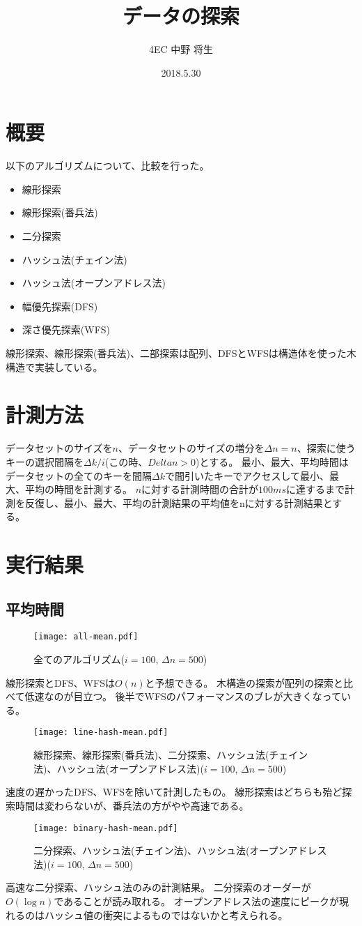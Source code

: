 \documentclass[dvipdfmx]{jsarticle}
\author{4EC 中野 将生}
\date{2018.5.30}
\title{データの探索}
\begin{document}
	\maketitle
	\section{概要}
		以下のアルゴリズムについて、比較を行った。
		\begin{itemize}
			\item 線形探索
			\item 線形探索(番兵法)
			\item 二分探索
			\item ハッシュ法(チェイン法)
			\item ハッシュ法(オープンアドレス法)
			\item 幅優先探索(DFS)
			\item 深さ優先探索(WFS)
		\end{itemize}
		線形探索、線形探索(番兵法)、二部探索は配列、DFSとWFSは構造体を使った木構造で実装している。
	\section{計測方法}
		データセットのサイズを$n$、データセットのサイズの増分を$\Delta n = n$、探索に使うキーの選択間隔を$\Delta k/i$(この時、$Delta n > 0$)とする。
		最小、最大、平均時間はデータセットの全てのキーを間隔$\Delta k$で間引いたキーでアクセスして最小、最大、平均の時間を計測する。
		$n$に対する計測時間の合計が$100 ms$に達するまで計測を反復し、最小、最大、平均の計測結果の平均値をnに対する計測結果とする。
	\section{実行結果}
		\subsection{平均時間}
			\begin{figure}[H]
				\caption{全てのアルゴリズム($i = 100$, $\Delta n = 500$)}
				\texttt{[image: all-mean.pdf]}
				\label{fig:all-mean}
			\end{figure}
			線形探索とDFS、WFSは$O(n)$と予想できる。
			木構造の探索が配列の探索と比べて低速なのが目立つ。
			後半でWFSのパフォーマンスのブレが大きくなっている。
			\begin{figure}[H]
				\caption{線形探索、線形探索(番兵法)、二分探索、ハッシュ法(チェイン法)、ハッシュ法(オープンアドレス法)($i = 100$, $\Delta n = 500$)}
				\texttt{[image: line-hash-mean.pdf]}
				\label{fig:line-hash-mean}
			\end{figure}
			速度の遅かったDFS、WFSを除いて計測したもの。
			線形探索はどちらも殆ど探索時間は変わらないが、番兵法の方がやや高速である。
			\begin{figure}[H]
				\caption{二分探索、ハッシュ法(チェイン法)、ハッシュ法(オープンアドレス法)($i = 100$, $\Delta n = 500$)}
				\texttt{[image: binary-hash-mean.pdf]}
				\label{fig:binary-hash-mean}
			\end{figure}
			高速な二分探索、ハッシュ法のみの計測結果。
			二分探索のオーダーが$O(\log n)$であることが読み取れる。
			オープンアドレス法の速度にピークが現れるのはハッシュ値の衝突によるものではないかと考えられる。
\end{document}

